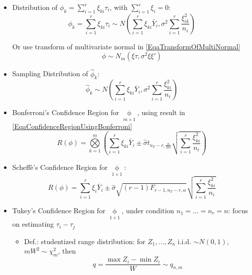 \begin{itemize}[topsep=2pt,itemsep=0pt]
    \item Distribution of $ \phi_k=\sum\limits_{i=1}^r\xi _{ki}\tau_i $, with $ \sum\limits_{i=1}^r\xi _i=0 $:
    \begin{equation}
        \phi_k=\sum_{i=1}^r\xi _{ki}\tau_i\sim N(\sum_{i=1}^r\xi _{ki}\bar{Y}_i,\sigma ^2\sum_{i=1}^r\dfrac{\xi _{ik}^2}{n_i})
    \end{equation}
    
    Or use transform of multivariate normal in \autoref{EqaTransformOfMultiNormal}
    \begin{equation}
         \phi \sim N_m(\xi \tau,\sigma ^2\xi \xi ')
    \end{equation}
    
    \item Sampling Distribution of $ \hat{\phi}_k  $:
    \begin{equation}
        \hat{\phi}_k\sim N(\sum_{i=1}^r\xi _{ki}\bar{Y}_i,\sigma ^2\sum_{i=1}^r\dfrac{\xi _{ki}^2}{n_i}) 
    \end{equation}
    
    \item Bonferroni's Confidence Region for $ \mathop{\phi}\limits_{m\times 1}  $, using result in \autoref{EqaConfidenceRegionUsingBonferroni}
    \begin{equation}
        R(\phi )= \bigotimes\limits_{k=1}^m\left(\sum_{i=1}^r\xi _{ki}\bar{Y}_i \pm \hat{\sigma }t_{n_T-r,\frac{\alpha }{2m}} \sqrt{\sum_{i=1}^r\dfrac{\xi _{ki}^2}{n_i}} \right)
    \end{equation}
    
    \item Scheff\`{e}'s Confidence Region for $ \mathop{\phi }\limits_{1\times 1} $:
    \begin{equation}
         R(\phi)=\sum_{i=1}^r\xi_i\bar{Y}_i\pm \hat{\sigma }\sqrt{(r-1)F_{r-1,n_T-r,\alpha }}\sqrt{\sum_{i=1}^r\dfrac{\xi _{ki}^2}{n_i}}
    \end{equation}
    
    \item Tukey's Confidence Region for $ \mathop{\phi }\limits_{1\times 1} $, under condition $ n_1=\ldots=n_r=n $: focus on estimating $ \tau_i-\tau_j $
    
    \begin{itemize}[topsep=2pt,itemsep=0pt]
        \item Def.: studentized range \hypertarget{TukeyStudentizedRangeDistribution}{}distribution: for $ Z_1,\ldots,Z_n $ i.i.d. $ \sim N(0 ,1) $, $ mW^2\sim \chi _m^2 $, then 
        \begin{equation}
            q=\dfrac{\max Z_i-\min Z_i}{W}\sim q_{n,m} 
        \end{equation}
    \end{itemize}
    

\end{itemize}
